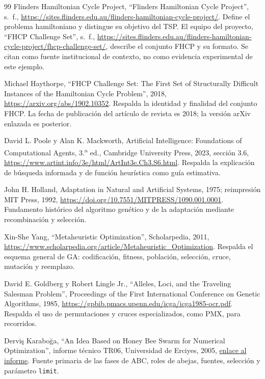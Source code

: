 \begin{thebibliography}{99}
Flinders Hamiltonian Cycle Project, ``Flinders Hamiltonian Cycle Project'', s.~f., \url{https://sites.flinders.edu.au/flinders-hamiltonian-cycle-project/}. Define el problema hamiltoniano y distingue su objetivo del TSP. El equipo del proyecto, ``FHCP Challenge Set'', s.~f., \url{https://sites.flinders.edu.au/flinders-hamiltonian-cycle-project/fhcp-challenge-set/}, describe el conjunto FHCP y su formato. Se citan como fuente institucional de contexto, no como evidencia experimental de este ejemplo.

Michael Haythorpe, ``FHCP Challenge Set: The First Set of Structurally Difficult Instances of the Hamiltonian Cycle Problem'', 2018, \url{https://arxiv.org/abs/1902.10352}. Respalda la identidad y finalidad del conjunto FHCP. La fecha de publicación del artículo de revista es 2018; la versión arXiv enlazada es posterior.

David L. Poole y Alan K. Mackworth, Artificial Intelligence: Foundations of Computational Agents, 3.\textsuperscript{a} ed., Cambridge University Press, 2023, sección 3.6, \url{https://www.artint.info/3e/html/ArtInt3e.Ch3.S6.html}. Respalda la explicación de búsqueda informada y de función heurística como guía estimativa.

John H. Holland, Adaptation in Natural and Artificial Systems, 1975; reimpresión MIT Press, 1992, \url{https://doi.org/10.7551/MITPRESS/1090.001.0001}. Fundamento histórico del algoritmo genético y de la adaptación mediante recombinación y selección.

Xin-She Yang, ``Metaheuristic Optimization'', Scholarpedia, 2011, \url{https://www.scholarpedia.org/article/Metaheuristic_Optimization}. Respalda el esquema general de GA: codificación, fitness, población, selección, cruce, mutación y reemplazo.

David E. Goldberg y Robert Lingle Jr., ``Alleles, Loci, and the Traveling Salesman Problem'', Proceedings of the First International Conference on Genetic Algorithms, 1985, \url{https://gpbib.pmacs.upenn.edu/icga/icga1985-ocr.pdf}. Respalda el uso de permutaciones y cruces especializados, como PMX, para recorridos.

Derviş Karaboğa, ``An Idea Based on Honey Bee Swarm for Numerical Optimization'', informe técnico TR06, Universidad de Erciyes, 2005, \href{https://citeseerx.ist.psu.edu/document?doi=cf20e34a1402a115523910d2a4243929f6704db1&repid=rep1&type=pdf}{enlace al informe}. Fuente primaria de las fases de ABC, roles de abejas, fuentes, selección y parámetro \texttt{limit}.


\end{thebibliography}
